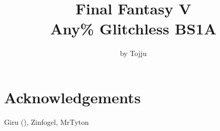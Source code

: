 \documentclass[a4paper]{report}
\title{\textbf{\Huge{Final Fantasy V \\ 
  Any\% Glitchless BS1A}}}
\author{\LARGE{by Tojju}}
\date{\vspace{-5ex}}
\begin{document}
\singlespacing
\maketitle
\tableofcontents
{}

\section*{Acknowledgements}
Giru (), Zinfogel, MrTyton

\setlength{\columnseprule}{0.2pt}
































\end{document}
